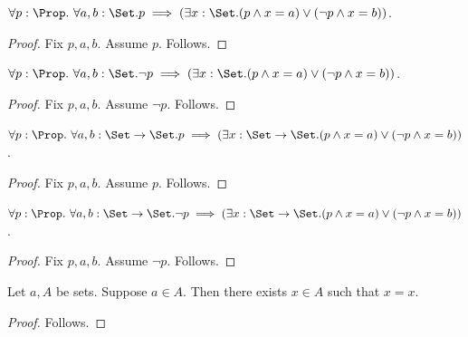 \begin{proposition}\label{obvious_set_conditional_true}
    $\forall p:\Prop.\ \forall a,b:\Set.
        p\implies (\exists x:\Set.
            (p\land x=a)\lor(\lnot p\land x=b))$.
\end{proposition}
\begin{proof}
    Fix $p,a,b$.
    Assume $p$.
    Follows.
\end{proof}

\begin{proposition}\label{obvious_set_conditional_false}
    $\forall p:\Prop.\ \forall a,b:\Set.
        \lnot p\implies (\exists x:\Set.
            (p\land x=a)\lor(\lnot p\land x=b))$.
\end{proposition}
\begin{proof}
    Fix $p,a,b$.
    Assume $\lnot p$.
    Follows.
\end{proof}

\begin{proposition}\label{obvious_function_conditional_true}
    $\forall p:\Prop.\ \forall a,b:\Set\to\Set.
        p\implies (\exists x:\Set\to\Set.
            (p\land x=a)\lor(\lnot p\land x=b))$.
\end{proposition}
\begin{proof}
    Fix $p,a,b$.
    Assume $p$.
    Follows.
\end{proof}

\begin{proposition}\label{obvious_function_conditional_false}
    $\forall p:\Prop.\ \forall a,b:\Set\to\Set.
        \lnot p\implies (\exists x:\Set\to\Set.
            (p\land x=a)\lor(\lnot p\land x=b))$.
\end{proposition}
\begin{proof}
    Fix $p,a,b$.
    Assume $\lnot p$.
    Follows.
\end{proof}

\begin{proposition}\label{obvious_member_witness}
    Let $a,A$ be sets.
    Suppose $a\in A$.
    Then there exists $x\in A$ such that $x=x$.
\end{proposition}
\begin{proof}
    Follows.
\end{proof}
